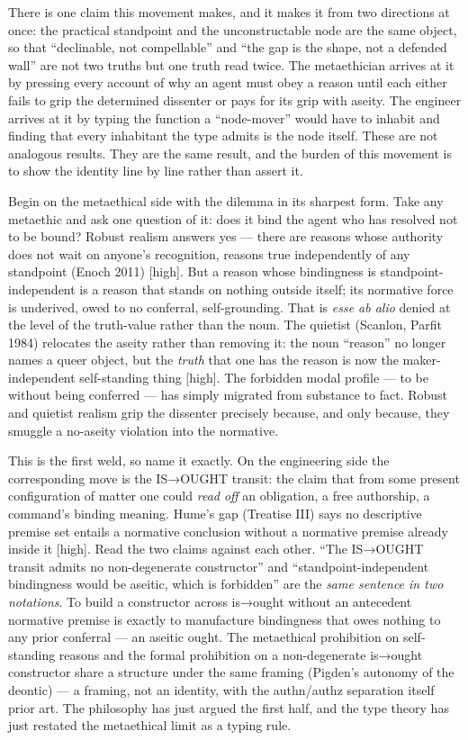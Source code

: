 \documentclass[11pt]{article}
\begin{document}
There is one claim this movement makes, and it makes it from two directions at once: the practical standpoint and the unconstructable node are the same object, so that ``declinable, not compellable'' and ``the gap is the shape, not a defended wall'' are not two truths but one truth read twice. The metaethician arrives at it by pressing every account of why an agent must obey a reason until each either fails to grip the determined dissenter or pays for its grip with aseity. The engineer arrives at it by typing the function a ``node-mover'' would have to inhabit and finding that every inhabitant the type admits is the node itself. These are not analogous results. They are the same result, and the burden of this movement is to show the identity line by line rather than assert it.

Begin on the metaethical side with the dilemma in its sharpest form. Take any metaethic and ask one question of it: does it bind the agent who has resolved not to be bound? Robust realism answers yes — there are reasons whose authority does not wait on anyone's recognition, reasons true independently of any standpoint (Enoch 2011) [high]. But a reason whose bindingness is standpoint-independent is a reason that stands on nothing outside itself; its normative force is underived, owed to no conferral, self-grounding. That is \emph{esse ab alio} denied at the level of the truth-value rather than the noun. The quietist (Scanlon, Parfit 1984) relocates the aseity rather than removing it: the noun ``reason'' no longer names a queer object, but the \emph{truth} that one has the reason is now the maker-independent self-standing thing [high]. The forbidden modal profile — to be without being conferred — has simply migrated from substance to fact. Robust and quietist realism grip the dissenter precisely because, and only because, they smuggle a no-aseity violation into the normative.

This is the first weld, so name it exactly. On the engineering side the corresponding move is the IS→OUGHT transit: the claim that from some present configuration of matter one could \emph{read off} an obligation, a free authorship, a command's binding meaning. Hume's gap (Treatise III) says no descriptive premise set entails a normative conclusion without a normative premise already inside it [high]. Read the two claims against each other. ``The IS→OUGHT transit admits no non-degenerate constructor'' and ``standpoint-independent bindingness would be aseitic, which is forbidden'' are the \emph{same sentence in two notations}. To build a constructor across is→ought without an antecedent normative premise is exactly to manufacture bindingness that owes nothing to any prior conferral — an aseitic ought. The metaethical prohibition on self-standing reasons and the formal prohibition on a non-degenerate is→ought constructor share a structure under the same framing (Pigden's autonomy of the deontic) — a framing, not an identity, with the authn/\allowbreak{}authz separation itself prior art. The philosophy has just argued the first half, and the type theory has just restated the metaethical limit as a typing rule.
\end{document}
